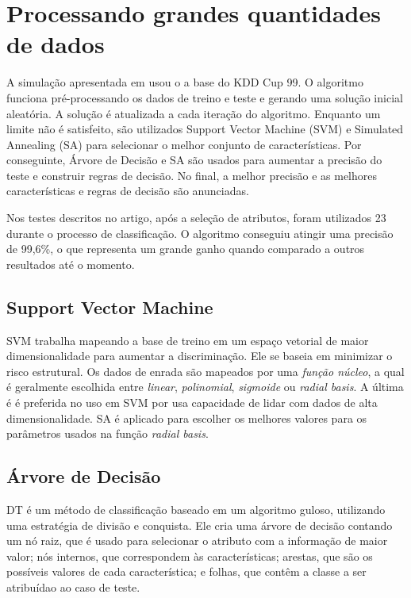 \section{Processando grandes quantidades de dados}
A simulação apresentada em \cite{lin12} usou o a base do KDD Cup 99. O algoritmo funciona pré-processando os dados de treino e teste e gerando uma solução
inicial aleatória. A solução é atualizada a cada iteração do algoritmo. Enquanto um limite não é satisfeito,
são utilizados Support Vector Machine (SVM) e Simulated Annealing (SA) para selecionar o melhor conjunto de
características. Por conseguinte, Árvore de Decisão e SA são usados para aumentar a precisão do teste e construir
regras de decisão. No final, a melhor precisão e as melhores características e regras de decisão são anunciadas.
\par Nos testes descritos no  artigo, após a seleção de atributos, foram utilizados 23 durante o processo de
classificação. O algoritmo conseguiu atingir uma precisão de 99,6\%, o que representa um grande ganho quando comparado
 a outros resultados até o momento.

\subsection{Support Vector Machine}
SVM trabalha mapeando a base de treino em um espaço vetorial de maior dimensionalidade para aumentar a discriminação.
Ele se baseia em minimizar o risco estrutural. Os dados de enrada são mapeados por uma \textit{função núcleo}, a qual
é geralmente escolhida entre \textit{linear}, \textit{polinomial}, \textit{sigmoide} ou \textit{radial basis}. A última é
é preferida no uso em SVM por usa capacidade de lidar com dados de alta dimensionalidade. SA é aplicado para escolher
os melhores valores para os parâmetros usados na função \textit{radial basis}.

\subsection{Árvore de Decisão}
DT é um método de classificação baseado em um algoritmo guloso, utilizando uma estratégia de divisão e conquista. Ele
cria uma árvore de decisão contando um nó raiz, que é usado para selecionar o atributo com a informação de maior valor;
nós internos, que correspondem às características; arestas, que são os possíveis valores de cada característica; e
folhas, que contêm a classe a ser atribuídao ao caso de teste.


